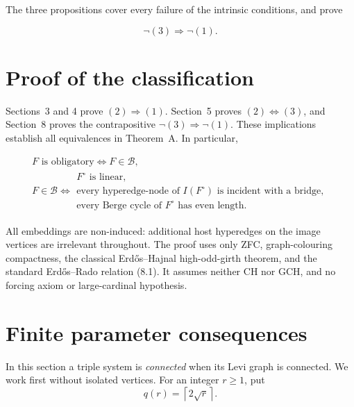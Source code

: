 \documentclass[a4paper,11pt,reqno]{amsart}
\theoremstyle{plain}
\theoremstyle{definition}
\theoremstyle{remark}
\begin{document}
The three propositions cover every failure of the intrinsic conditions, and prove

\[
\neg(3)\Longrightarrow\neg(1). \tag{8.2}
\]

\section{Proof of the classification}\label{conclusion}

Sections~3 and 4 prove \((2)\Longrightarrow(1)\). Section~5 proves
\((2)\Longleftrightarrow(3)\), and Section~8 proves the contrapositive
\(\neg(3)\Longrightarrow\neg(1)\). These implications establish all
equivalences in Theorem~A. In particular,

\begingroup\small
\[
\begin{gathered}
F\text{ is obligatory}
\iff
F\in\mathcal B,\\[1mm]
F\in\mathcal B
\iff
\begin{array}{l}
F^\circ\text{ is linear},\\[1mm]
\text{every hyperedge-node of }I(F^\circ)
\text{ is incident with a bridge},\\[1mm]
\text{every Berge cycle of }F^\circ\text{ has even length}.
\end{array}
\end{gathered}
\]
\endgroup

All embeddings are non-induced: additional host hyperedges on the image vertices are irrelevant throughout. The proof uses only ZFC, graph-colouring compactness, the classical Erd\H{o}s--Hajnal high-odd-girth theorem, and the standard Erd\H{o}s--Rado relation (8.1). It assumes neither CH nor GCH, and no forcing axiom or large-cardinal hypothesis.

\section{Finite parameter consequences}\label{finite-parameter-consequences}

In this section a triple system is \emph{connected} when its Levi graph is
connected.  We work first without isolated vertices.  For an integer $r\ge1$,
put
\[
q(r)=\left\lceil2\sqrt r\right\rceil.
\]
\end{document}
